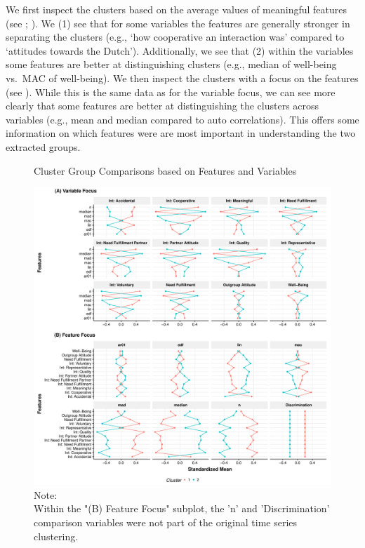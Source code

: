 We first inspect the clusters based on the average values of meaningful
features (see ; \citealp{Kennedy2021}). We
(1) see that for some variables the features are generally stronger in
separating the clusters (e.g., `how cooperative an interaction was'
compared to `attitudes towards the Dutch'). Additionally, we see that
(2) within the variables some features are better at distinguishing
clusters (e.g., median of well-being vs.~MAC of well-being). We then
inspect the clusters with a focus on the features (see
). While this is the same data as for the
variable focus, we can see more clearly that some features are better at
distinguishing the clusters across variables (e.g., mean and median
compared to auto correlations). This offers some information on which
features were are most important in understanding the two extracted
groups.

\begin{figure}[!ht] %
  \caption{Cluster Group Comparisons based on Features and Variables}
  \label{fig:clusterFeatVar}
  \centering\includegraphics[width=\textwidth]{figures/clusterFeatVarComb.pdf}
  \caption*{Note: \\
  Within the "(B) Feature Focus" subplot, the 'n' and 'Discrimination' comparison variables were not part of the original time series clustering.}
\end{figure}

